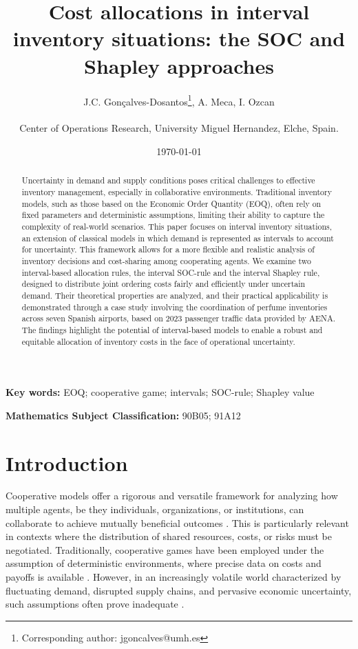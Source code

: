 \documentclass[12pt]{article}
\title{Cost allocations in interval inventory situations: the SOC and Shapley approaches}
\author{J.C. Gonçalves-Dosantos\footnote{Corresponding author: jgoncalves@umh.es}, A. Meca, I. Ozcan\\\\Center of Operations Research, University Miguel Hernandez, Elche, Spain.}
\date{\today }
\begin{document}
\maketitle

\begin{abstract}  
\noindent Uncertainty in demand and supply conditions poses critical challenges to effective inventory management, especially in collaborative environments. Traditional inventory models, such as those based on the Economic Order Quantity (EOQ), often rely on fixed parameters and deterministic assumptions, limiting their ability to capture the complexity of real-world scenarios. This paper focuses on interval inventory situations, an extension of classical models in which demand is represented as intervals to account for uncertainty. This framework allows for a more flexible and realistic analysis of inventory decisions and cost-sharing among cooperating agents. We examine two interval-based allocation rules, the interval SOC-rule and the interval Shapley rule, designed to distribute joint ordering costs fairly and efficiently under uncertain demand. Their theoretical properties are analyzed, and their practical applicability is demonstrated through a case study involving the coordination of perfume inventories across seven Spanish airports, based on 2023 passenger traffic data provided by AENA. The findings highlight the potential of interval-based models to enable a robust and equitable allocation of inventory costs in the face of operational uncertainty.
\end{abstract}

\textbf{Key words:} EOQ; cooperative game; intervals; SOC-rule; Shapley value\newline 


\noindent \textbf{Mathematics Subject Classification:} 90B05; 91A12  

\section{Introduction} 

\noindent Cooperative models offer a rigorous and versatile framework for analyzing how multiple agents, be they individuals, organizations, or institutions, can collaborate to achieve mutually beneficial outcomes \cite{Myerson1991}. This is particularly relevant in contexts where the distribution of shared resources, costs, or risks must be negotiated. Traditionally, cooperative games have been employed under the assumption of deterministic environments, where precise data on costs and payoffs is available \cite{Shapley1953}. However, in an increasingly volatile world characterized by fluctuating demand, disrupted supply chains, and pervasive economic uncertainty, such assumptions often prove inadequate \cite{Snyder2006}.
\end{document}
